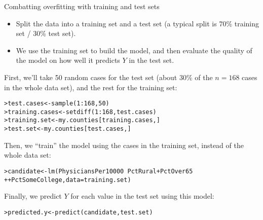 \documentclass{beamer}\usepackage[]{graphicx}\usepackage[]{color}
\makeatletter
\newcommand{\hlnum}[1]{\textcolor[rgb]{0.824,0.412,0.118}{#1}}%
\newcommand{\hlopt}[1]{\textcolor[rgb]{1,0.894,0.769}{#1}}%
\newcommand{\hlstd}[1]{\textcolor[rgb]{1,0.894,0.769}{#1}}%
\newcommand{\hlkwb}[1]{\textcolor[rgb]{0.804,0.776,0.451}{#1}}%
\newcommand{\hlkwc}[1]{\textcolor[rgb]{0.78,0.941,0.545}{#1}}%
\newcommand{\hlkwd}[1]{\textcolor[rgb]{1,0.78,0.769}{#1}}%
\newenvironment{kframe}{%
 \def\at@end@of@kframe{}%
 \ifinner\ifhmode%
  \def\at@end@of@kframe{\end{minipage}}%
  \begin{minipage}{\columnwidth}%
 \fi\fi%
 \def\FrameCommand##1{\hskip\@totalleftmargin \hskip-\fboxsep
 \colorbox{shadecolor}{##1}\hskip-\fboxsep
     \hskip-\linewidth \hskip-\@totalleftmargin \hskip\columnwidth}%
 \MakeFramed {\advance\hsize-\width
   \@totalleftmargin\z@ \linewidth\hsize
   \@setminipage}}%
 {\par\unskip\endMakeFramed%
 \at@end@of@kframe}
\newenvironment{knitrout}{}{} %
\makeatother
\begin{document}
\begin{darkframes}
\begin{frame}{Combatting overfitting with training and test sets}
      \begin{itemize}
        \item Split the data into a \alert{training set} and a \alert{test set} (a typical split is 70\% training set / 30\% test set).
        \item We use the training set to build the model, and then evaluate the quality of the model on how well it predicts $Y$ in the test set.
      \end{itemize}
    \end{frame}

    \begin{frame}[fragile]
      \fontsm
      First, we'll take 50 random cases for the test set (about 30\% of the $n=168$ cases in the whole data set), and the rest for the training set:
\begin{knitrout}
\begin{kframe}
\begin{alltt}
\hlstd{> }\hlstd{test.cases} \hlkwb{<-} \hlkwd{sample}\hlstd{(}\hlnum{1}\hlopt{:}\hlnum{168}\hlstd{,} \hlnum{50}\hlstd{)}
\hlstd{> }\hlstd{training.cases} \hlkwb{<-} \hlkwd{setdiff}\hlstd{(}\hlnum{1}\hlopt{:}\hlnum{168}\hlstd{, test.cases)}
\hlstd{> }\hlstd{training.set} \hlkwb{<-} \hlstd{my.counties[training.cases,]}
\hlstd{> }\hlstd{test.set} \hlkwb{<-} \hlstd{my.counties[test.cases,]}
\end{alltt}
\end{kframe}
\end{knitrout}

      \pause

      Then, we ``train'' the model using the cases in the \alert{training} set, instead of the whole data set:
\begin{knitrout}
\begin{kframe}
\begin{alltt}
\hlstd{> }\hlstd{candidate} \hlkwb{<-} \hlkwd{lm}\hlstd{(PhysiciansPer10000} \hlopt{~} \hlstd{PctRural} \hlopt{+} \hlstd{PctOver65}
\hlstd{+ }                  \hlopt{+} \hlstd{PctSomeCollege,} \hlkwc{data}\hlstd{=training.set)}
\end{alltt}
\end{kframe}
\end{knitrout}
    \end{frame}

    \begin{frame}[fragile]
      Finally, we predict $Y$ for each value in the \alert{test} set using this model:
\begin{knitrout}
\begin{kframe}
\begin{alltt}
\hlstd{> }\hlstd{predicted.y} \hlkwb{<-} \hlkwd{predict}\hlstd{(candidate, test.set)}
\end{alltt}
\end{kframe}
\end{knitrout}


\end{frame}
\end{darkframes}
\end{document}
